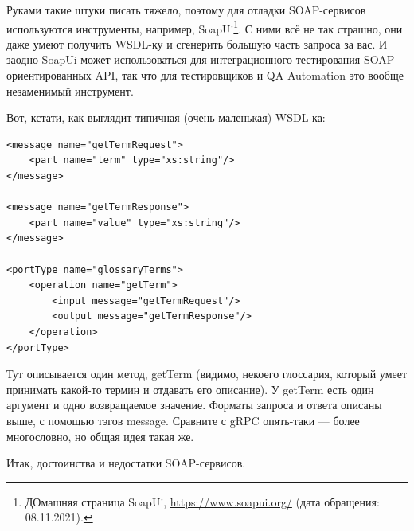 \documentclass{../../text-style}
\begin{document}
Руками такие штуки писать тяжело, поэтому для отладки SOAP-сервисов используются инструменты, например, SoapUi\footnote{ДОмашняя страница SoapUi, \url{https://www.soapui.org/} (дата обращения: 08.11.2021).}. С ними всё не так страшно, они даже умеют получить WSDL-ку и сгенерить большую часть запроса за вас. И заодно SoapUi может использоваться для интеграционного тестирования SOAP-ориентированных API, так что для тестировщиков и QA Automation это вообще незаменимый инструмент.

Вот, кстати, как выглядит типичная (очень маленькая) WSDL-ка:

\begin{verbatim}
<message name="getTermRequest">
    <part name="term" type="xs:string"/>
</message>

<message name="getTermResponse">
    <part name="value" type="xs:string"/>
</message>

<portType name="glossaryTerms">
    <operation name="getTerm">
        <input message="getTermRequest"/>
        <output message="getTermResponse"/>
    </operation>
</portType>
\end{verbatim}

Тут описывается один метод, getTerm (видимо, некоего глоссария, который умеет принимать какой-то термин и отдавать его описание). У getTerm есть один аргумент и одно возвращаемое значение. Форматы запроса и ответа описаны выше, с помощью тэгов message. Сравните с gRPC опять-таки --- более многословно, но общая идея такая же.

Итак, достоинства и недостатки SOAP-сервисов.
\end{document}
